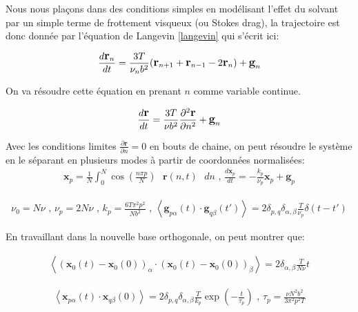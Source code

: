 \documentclass[a4paper,11pt]{article}
\begin{document}
Nous nous plaçons dans des conditions simples en modélisant l'effet du solvant par un simple terme de frottement visqueux (ou Stokes drag), la trajectoire est donc donnée par l'équation de Langevin \ref{langevin} qui s'écrit ici:

\begin{eqnarray}
\large{
\frac{d \textbf{r}_n}{dt} =  \frac{3T}{\nu_n b^2}( \textbf{r}_{n+1} +\textbf{r}_{n-1} -2\textbf{r}_n )  + \textbf{g}_n}
\end{eqnarray}

On va résoudre cette équation en prenant $n$ comme variable continue.

\begin{eqnarray}
\large{
\frac{d \textbf{r}}{dt} =  \frac{3T}{\nu b^2}\frac{\partial ^2 \textbf{r}}{\partial  n^2} + \textbf{g}_n}
\end{eqnarray}

Avec les conditions limites $\frac{\partial  \textbf{r}}{\partial  n}=0$ en bouts de chaine, on peut résoudre le système en le séparant en plusieurs modes à  partir de coordonnées normalisées: 
\begin{eqnarray}
\textbf{x}_p= \frac{1}{N} \int_0^N \cos \left(\frac{n\pi p}{N}\right) \text{ }\textbf{r}(n,t)\text{ } dn \text{ , } \frac{d \textbf{x}_p}{dt} =  -\frac{k_p}{\nu _p} \textbf{x}_p + \textbf{g}_p
\end{eqnarray}



\begin{eqnarray}
\nu_0=  N \nu \text{ , } \nu_p= 2 N \nu  \text{ , }  k_p=\frac{6T\pi^2 p^2}{N b^2}  \text{ , }  \left<\textbf{g}_{p\alpha}(t) \cdot \textbf{g}_{q\beta}(t')\right> = 2\delta_{p,q} \delta_{\alpha ,\beta} \frac{T}{\nu_p} \delta(t-t')
\end{eqnarray}

En travaillant dans la nouvelle base orthogonale, on peut montrer que:


\begin{eqnarray}
\left<(\textbf{x}_{0}(t)-\textbf{x}_{0}(0))_\alpha \cdot (\textbf{x}_{0}(t)-\textbf{x}_{0}(0))_\beta \right> = 2 \delta_{\alpha ,\beta} \frac{T}{N\nu}t
\end{eqnarray}

\begin{eqnarray}
\left<\textbf{x}_{p\alpha}(t) \cdot \textbf{x}_{q\beta}(0)\right> = 2\delta_{p,q} \delta_{\alpha ,\beta} \frac{T}{k_p} \exp\left(-\frac{t}{\tau_p}\right) \text{ , } \tau _p = \frac{\nu N^2 b^2}{3\pi^2p^2T}
\end{eqnarray}
\end{document}
